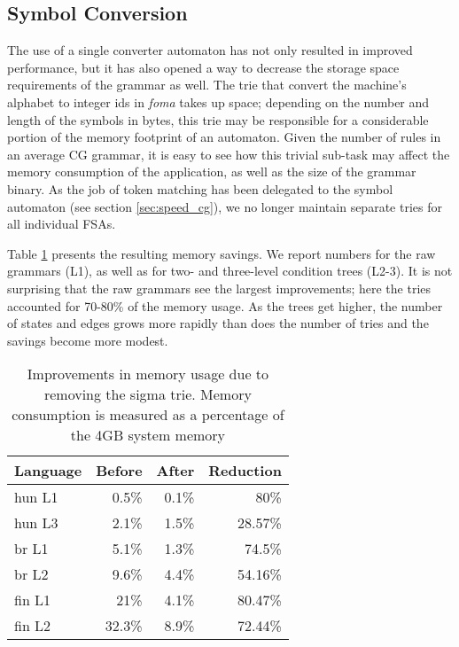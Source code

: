 \documentclass[11pt]{article}
\begin{document}
\subsection{Symbol Conversion}
\label{sec:sub_token}

The use of a single converter automaton has not only resulted in improved
performance, but it has also opened a way to decrease the storage space
requirements of the grammar as well. The trie that convert the 
machine's alphabet to integer ids in \emph{foma} takes up space; depending on
the number and length of the symbols in bytes, this trie may be responsible for
a considerable portion of the memory
footprint of an automaton. Given the number of rules in an average CG grammar,
it is easy to see how this trivial sub-task may affect the memory consumption of
the application, as well as the size of the grammar binary.
As the job of token matching has been delegated to the symbol
automaton (see section \ref{sec:speed_cg}), we no longer maintain
separate tries for all individual FSAs. 

Table \ref{tab:sigma_memory} presents the resulting memory savings.
We report numbers for the raw grammars (L1), as well as for two- and three-level
condition trees (L2-3). It is not surprising that the raw grammars see the
largest improvements; here the tries accounted for 70-80\% of the memory
usage. As the trees get higher, the number of states and edges grows more
rapidly than does the number of tries and the savings become more modest.

\begin{table}[h]
  \centering
  \caption{Improvements in memory usage due to removing the sigma trie. Memory
           consumption is measured as a percentage of the 4GB system memory}
  \label{tab:sigma_memory}
  \begin{tabular}{ | l | r | r | r | }
  \hline
  \textbf{Language} & \textbf{Before} & \textbf{After} & \textbf{Reduction} \\
  \hline
  hun L1 & 0.5\% & 0.1\% & 80\% \\
  hun L3 & 2.1\% & 1.5\% & 28.57\% \\
  br L1 & 5.1\% & 1.3\% & 74.5\% \\
  br L2 & 9.6\% & 4.4\% & 54.16\% \\
  fin L1 & 21\% & 4.1\% & 80.47\% \\
  fin L2 & 32.3\% & 8.9\% & 72.44\% \\
  \hline
  \end{tabular}
\end{table}
\end{document}
